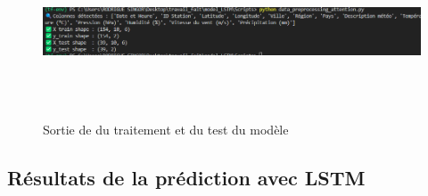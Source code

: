 \documentclass[a4paper,12pt,openany]{report}
\begin{document}
\begin{figure}[H]
	\begin{center}
		 \begin{minipage}{\textwidth}
		    \begin{center}
		    \includegraphics[width=1\textwidth,height=2in]{images/TRAITEMENT_TEXT.png}
		    \end{center}
		    \end{minipage}
		\caption{Sortie de du traitement et du test du modèle \label{Fig 3.1}}
	\end{center}
\end{figure}

\subsection{Résultats de la prédiction avec LSTM}
\end{document}
